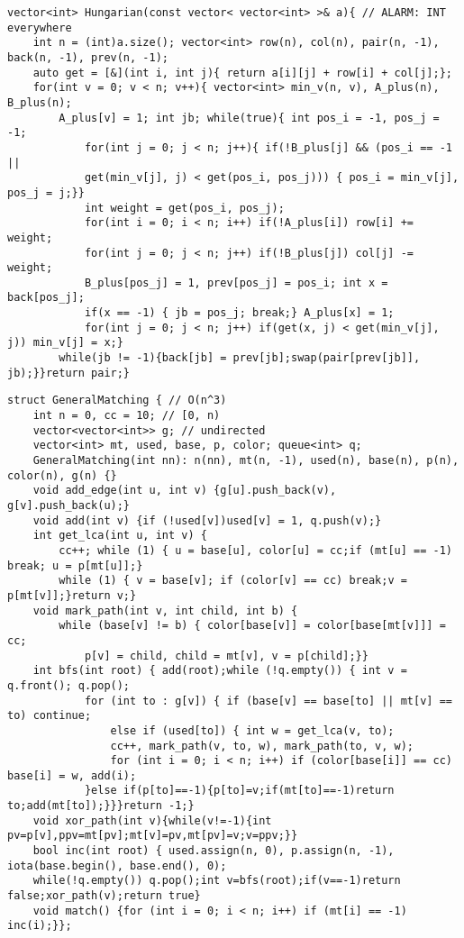 \documentclass[12pt]{article}
\begin{document}
\begin{verbatim}
vector<int> Hungarian(const vector< vector<int> >& a){ // ALARM: INT everywhere
    int n = (int)a.size(); vector<int> row(n), col(n), pair(n, -1), back(n, -1), prev(n, -1);
    auto get = [&](int i, int j){ return a[i][j] + row[i] + col[j];};
    for(int v = 0; v < n; v++){ vector<int> min_v(n, v), A_plus(n), B_plus(n);
        A_plus[v] = 1; int jb; while(true){ int pos_i = -1, pos_j = -1;
            for(int j = 0; j < n; j++){ if(!B_plus[j] && (pos_i == -1 || 
            get(min_v[j], j) < get(pos_i, pos_j))) { pos_i = min_v[j], pos_j = j;}}
            int weight = get(pos_i, pos_j);
            for(int i = 0; i < n; i++) if(!A_plus[i]) row[i] += weight;
            for(int j = 0; j < n; j++) if(!B_plus[j]) col[j] -= weight;
            B_plus[pos_j] = 1, prev[pos_j] = pos_i; int x = back[pos_j];
            if(x == -1) { jb = pos_j; break;} A_plus[x] = 1;
            for(int j = 0; j < n; j++) if(get(x, j) < get(min_v[j], j)) min_v[j] = x;}
        while(jb != -1){back[jb] = prev[jb];swap(pair[prev[jb]], jb);}}return pair;}
\end{verbatim}

\begin{verbatim}
struct GeneralMatching { // O(n^3)
    int n = 0, cc = 10; // [0, n)
    vector<vector<int>> g; // undirected
    vector<int> mt, used, base, p, color; queue<int> q;
    GeneralMatching(int nn): n(nn), mt(n, -1), used(n), base(n), p(n), color(n), g(n) {}
    void add_edge(int u, int v) {g[u].push_back(v), g[v].push_back(u);}
    void add(int v) {if (!used[v])used[v] = 1, q.push(v);}
    int get_lca(int u, int v) {
        cc++; while (1) { u = base[u], color[u] = cc;if (mt[u] == -1) break; u = p[mt[u]];}
        while (1) { v = base[v]; if (color[v] == cc) break;v = p[mt[v]];}return v;}
    void mark_path(int v, int child, int b) {
        while (base[v] != b) { color[base[v]] = color[base[mt[v]]] = cc;
            p[v] = child, child = mt[v], v = p[child];}}
    int bfs(int root) { add(root);while (!q.empty()) { int v = q.front(); q.pop();
            for (int to : g[v]) { if (base[v] == base[to] || mt[v] == to) continue;
                else if (used[to]) { int w = get_lca(v, to);
                cc++, mark_path(v, to, w), mark_path(to, v, w);
                for (int i = 0; i < n; i++) if (color[base[i]] == cc) base[i] = w, add(i);
            }else if(p[to]==-1){p[to]=v;if(mt[to]==-1)return to;add(mt[to]);}}}return -1;}
    void xor_path(int v){while(v!=-1){int pv=p[v],ppv=mt[pv];mt[v]=pv,mt[pv]=v;v=ppv;}}
    bool inc(int root) { used.assign(n, 0), p.assign(n, -1), iota(base.begin(), base.end(), 0);
    while(!q.empty()) q.pop();int v=bfs(root);if(v==-1)return false;xor_path(v);return true}
    void match() {for (int i = 0; i < n; i++) if (mt[i] == -1) inc(i);}};
\end{verbatim}
\end{document}
